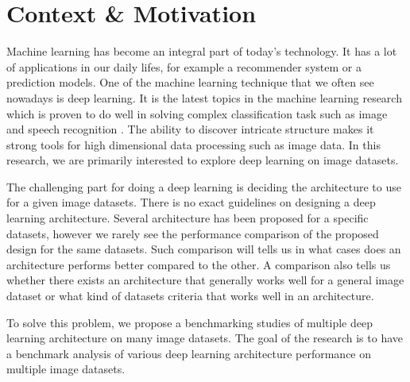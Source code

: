 \section{Context \& Motivation}
Machine learning has become an integral part of today's technology. It has a lot of applications in our daily lifes, for example a recommender system or a prediction models. One of the machine learning technique that we often see nowadays is deep learning. It is the latest topics in the machine learning research which is proven to do well in solving complex classification task such as image and speech recognition \cite{krizhevsky2012imagenet}. The ability to discover intricate structure makes it strong tools for high dimensional data processing such as image data. In this research, we are primarily interested to explore deep learning on image datasets.

The challenging part for doing a deep learning is deciding the architecture to use for a given image datasets. There is no exact guidelines on designing a deep learning architecture. Several architecture has been proposed for a specific datasets, however we rarely see the performance comparison of the proposed design for the same datasets. Such comparison will tells us in what cases does an architecture performs better compared to the other. A comparison also tells us whether there exists an architecture that generally works well for a general image dataset or what kind of datasets criteria that works well in an architecture.

To solve this problem, we propose a benchmarking studies of multiple deep learning architecture on many image datasets. The goal of the research is to have a benchmark analysis of various deep learning architecture performance on multiple image datasets.   \\





